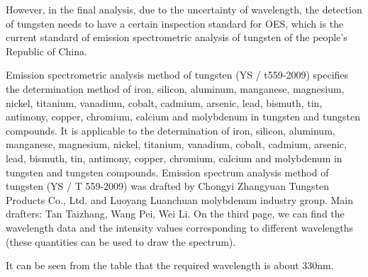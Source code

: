 \documentclass{apmcmthesis}
\begin{document}
\begin{itemize}
\qquad However, in the final analysis, due to the uncertainty of wavelength, the detection of tungsten needs to have a certain inspection standard for OES, which is the current standard of emission spectrometric analysis of tungsten of the people's Republic of China.\par

\qquad Emission spectrometric analysis method of tungsten (YS / t559-2009) specifies the determination method of iron, silicon, aluminum, manganese, magnesium, nickel, titanium, vanadium, cobalt, cadmium, arsenic, lead, bismuth, tin, antimony, copper, chromium, calcium and molybdenum in tungsten and tungsten compounds. It is applicable to the determination of iron, silicon, aluminum, manganese, magnesium, nickel, titanium, vanadium, cobalt, cadmium, arsenic, lead, bismuth, tin, antimony, copper, chromium, calcium and molybdenum in tungsten and tungsten compounds. Emission spectrum analysis method of tungsten (YS / T 559-2009) was drafted by Chongyi Zhangyuan Tungsten Products Co., Ltd. and Luoyang Luanchuan molybdenum industry group. Main drafters: Tan Taizhang, Wang Pei, Wei Li.
\qquad On the third page, we can find the wavelength data and the intensity values corresponding to different wavelengths (these quantities can be used to draw the spectrum).\par

It can be seen from the table that the required wavelength is about 330nm.\par


\end{itemize}
\end{document}

